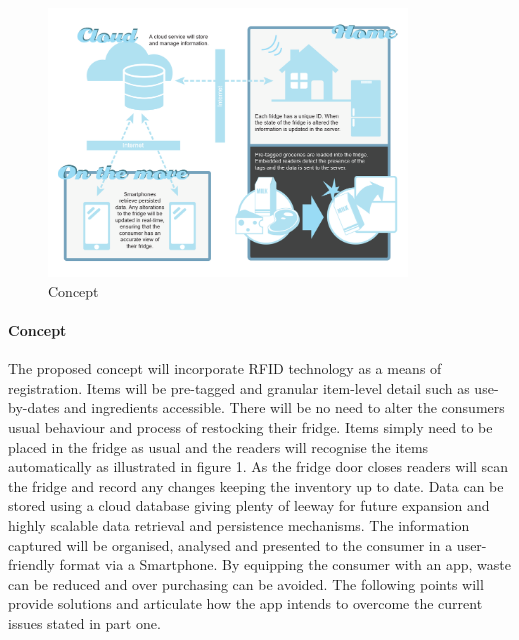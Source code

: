 \documentclass[a4paper, 11pt]{article}
\begin{document}
\begin{figure}[h!]
  \centering
    \includegraphics[width=0.85\textwidth]{system2.png}
      \caption{Concept}
\end{figure}

\paragraph{Concept}The proposed concept will incorporate RFID technology as a means of registration. Items will be pre-tagged and granular item-level detail such as use-by-dates and ingredients accessible. There will be no need to alter the consumers usual behaviour and process of restocking their fridge. Items simply need to be placed in the fridge as usual and the readers will recognise the items automatically as illustrated in figure 1. As the fridge door closes readers will scan the fridge and record any changes keeping the inventory up to date. Data can be stored using a cloud database giving plenty of leeway for future expansion and highly scalable data retrieval and persistence mechanisms. The information captured will be organised, analysed and presented to the consumer in a user-friendly format via a Smartphone. By equipping the consumer with an app, waste can be reduced and over purchasing can be avoided. The following points will provide solutions and articulate how the app intends to overcome the current issues stated in part one.

\vspace{\baselineskip}
\end{document}

